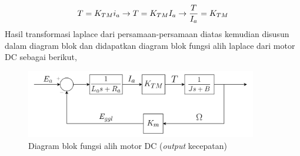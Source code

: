\documentclass[../cover.tex]{subfiles}
\begin{document}
            \begin{equation}
                T = K_{TM}i_a \rightarrow T = K_{TM}I_a \rightarrow \frac{T}{I_a} = K_{TM} \\[5pt]
            \end{equation}
            Hasil transformasi laplace dari persamaan-persamaan diatas kemudian disusun dalam diagram blok dan didapatkan diagram blok fungsi alih laplace dari motor DC sebagai berikut\cite{Arifin},
            \begin{figure}[H]
                \centering
                \includegraphics[width = 0.9\textwidth]{assets/image/pemodelan_laplace_motor_dc.png}
                \caption{Diagram blok fungsi alih motor DC (\textit{output} kecepatan)}
                \label{gambar_6}
            \end{figure}
\end{document}
